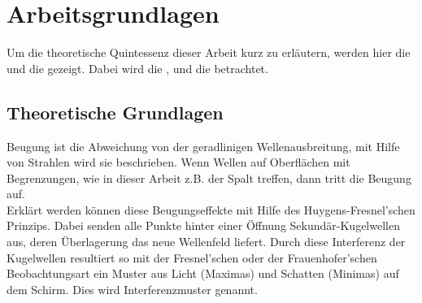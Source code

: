 \chapter{Arbeitsgrundlagen}
\setcounter{page}{1} \thispagestyle{fancy} 
Um die theoretische Quintessenz dieser Arbeit kurz zu erläutern, werden hier die \textit{} und die \textit{} gezeigt. Dabei wird die \textit{}, \textit{} und die \textit{} betrachtet.

\section{Theoretische Grundlagen}
Beugung ist die Abweichung von der geradlinigen Wellenausbreitung, mit Hilfe von Strahlen wird sie beschrieben. Wenn Wellen auf Oberflächen mit Begrenzungen, wie in dieser Arbeit z.B. der Spalt treffen, dann tritt die Beugung auf.\\[0.5cm]
Erklärt werden können diese Beugungseffekte mit Hilfe des Huygens-Fresnel’schen Prinzips. Dabei senden alle Punkte hinter einer Öffnung Sekundär-Kugelwellen aus, deren Überlagerung das neue Wellenfeld liefert. Durch diese Interferenz der Kugelwellen resultiert so mit der Fresnel'schen oder der Frauenhofer'schen Beobachtungsart ein Muster aus Licht (Maximas) und Schatten (Minimas) auf dem Schirm. Dies wird Interferenzmuster genannt\cite{Angaben2011}.\\

